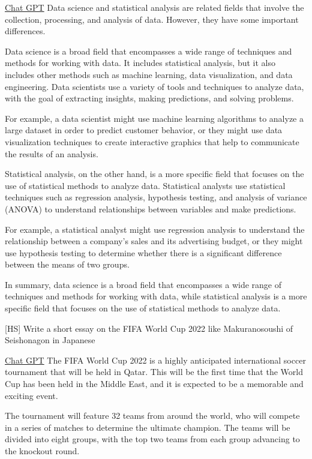 \documentclass[
]{bxjsbook}
\theoremstyle{definition}
\theoremstyle{definition}
\theoremstyle{definition}
\theoremstyle{definition}
\theoremstyle{remark}
\begin{document}
\protect\hyperlink{chatgpt}{Chat GPT} Data science and statistical analysis are related fields that involve the collection, processing, and analysis of data. However, they have some important differences.

Data science is a broad field that encompasses a wide range of techniques and methods for working with data. It includes statistical analysis, but it also includes other methods such as machine learning, data visualization, and data engineering. Data scientists use a variety of tools and techniques to analyze data, with the goal of extracting insights, making predictions, and solving problems.

For example, a data scientist might use machine learning algorithms to analyze a large dataset in order to predict customer behavior, or they might use data visualization techniques to create interactive graphics that help to communicate the results of an analysis.

Statistical analysis, on the other hand, is a more specific field that focuses on the use of statistical methods to analyze data. Statistical analysts use statistical techniques such as regression analysis, hypothesis testing, and analysis of variance (ANOVA) to understand relationships between variables and make predictions.

For example, a statistical analyst might use regression analysis to understand the relationship between a company's sales and its advertising budget, or they might use hypothesis testing to determine whether there is a significant difference between the means of two groups.

In summary, data science is a broad field that encompasses a wide range of techniques and methods for working with data, while statistical analysis is a more specific field that focuses on the use of statistical methods to analyze data.

{[}HS{]} Write a short essay on the FIFA World Cup 2022 like Makuranosoushi of Seishonagon in Japanese

\protect\hyperlink{chatgpt}{Chat GPT} The FIFA World Cup 2022 is a highly anticipated international soccer tournament that will be held in Qatar. This will be the first time that the World Cup has been held in the Middle East, and it is expected to be a memorable and exciting event.

The tournament will feature 32 teams from around the world, who will compete in a series of matches to determine the ultimate champion. The teams will be divided into eight groups, with the top two teams from each group advancing to the knockout round.
\end{document}
